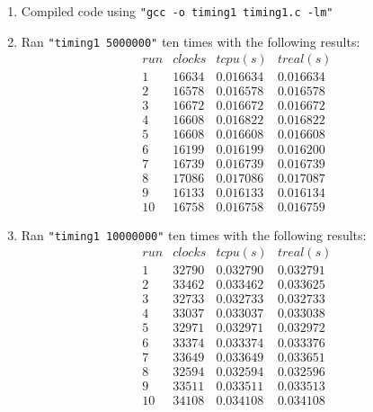 \documentclass[12pt,fleqn,leqno,letterpaper]{article}
\begin{document}
\begin{enumerate}
    \item Compiled code using \texttt{"gcc -o timing1 timing1.c -lm"}

    \item Ran \texttt{"timing1 5000000"} ten times with the following results:\\
        $$
        \begin{array}{lccc}
            run & clocks & t cpu (s) & t real (s) \\
            1 & 16634 & 0.016634 & 0.016634 \\
            2 & 16578 & 0.016578 & 0.016578 \\
            3 & 16672 & 0.016672 & 0.016672 \\
            4 & 16608 & 0.016822 & 0.016822 \\
            5 & 16608 & 0.016608 & 0.016608 \\
            6 & 16199 & 0.016199 & 0.016200 \\
            7 & 16739 & 0.016739 & 0.016739 \\
            8 & 17086 & 0.017086 & 0.017087 \\
            9 & 16133 & 0.016133 & 0.016134 \\
            10 & 16758 & 0.016758 & 0.016759
        \end{array}
        $$

    \item Ran \texttt{"timing1 10000000"} ten times with the following
        results:\\
        $$
        \begin{array}{lccc}
            run & clocks & t cpu (s) & t real (s) \\
            1 & 32790 & 0.032790 & 0.032791 \\
            2 & 33462 & 0.033462 & 0.033625 \\
            3 & 32733 & 0.032733 & 0.032733 \\
            4 & 33037 & 0.033037 & 0.033038\\
            5 & 32971 & 0.032971 & 0.032972 \\
            6 & 33374 & 0.033374 & 0.033376 \\
            7 & 33649 & 0.033649 & 0.033651 \\
            8 & 32594 & 0.032594 & 0.032596 \\
            9 & 33511 & 0.033511 & 0.033513 \\
            10 & 34108 & 0.034108 & 0.034108
        \end{array}
        $$


\end{enumerate}
\end{document}
